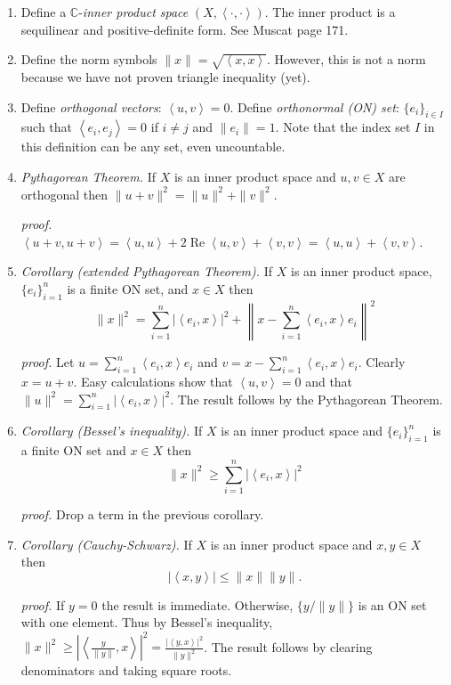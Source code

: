 \documentclass[11pt]{article}
\newcommand{\CC}{\mathbb{C}}
\renewcommand{\Re}{\operatorname{Re}}
\newcommand{\ip}[2]{\ensuremath{\left<#1,#2\right>}}
\begin{document}
\begin{enumerate}
\renewcommand{\labelenumi}{{\Large \textbf{\Alph{enumi}.}}\,}
\item Define a $\CC$-\emph{inner product space} $(X,\ip{\cdot}{\cdot})$.  The inner product is a sequilinear and positive-definite form.  See Muscat page 171.

\item Define the norm symbols $\|x\|=\sqrt{\ip{x}{x}}$.  However, this is not a norm because we have not proven triangle inequality (yet).

\item Define \emph{orthogonal vectors}: $\ip{u}{v}=0$.  Define \emph{orthonormal (ON) set}: $\{e_i\}_{i\in I}$ such that $\ip{e_i}{e_j}=0$ if $i\ne j$ and $\|e_i\|=1$.  Note that the index set $I$ in this definition can be any set, even uncountable.

\item \emph{Pythagorean Theorem.}  If $X$ is an inner product space and $u,v\in X$ are orthogonal then $\|u+v\|^2 = \|u\|^2 + \|v\|^2$.

\emph{proof.}  $\ip{u+v}{u+v} = \ip{u}{u} + 2 \Re\ip{u}{v} + \ip v v = \ip{u}{u} + \ip v v$.

\item \emph{Corollary (extended Pythagorean Theorem).}  If $X$ is an inner product space, $\{e_i\}_{i=1}^n$ is a finite ON set, and $x\in X$ then
    $$\|x\|^2 = \sum_{i=1}^n |\ip{e_i}{x}|^2 + \left\|x - \sum_{i=1}^n \ip{e_i}{x} e_i\right\|^2$$

\emph{proof.}  Let $u = \sum_{i=1}^n \ip{e_i}{x} e_i$ and $v = x - \sum_{i=1}^n \ip{e_i}{x} e_i$.  Clearly $x=u+v$.  Easy calculations show that $\ip{u}{v}=0$ and that $\|u\|^2 = \sum_{i=1}^n |\ip{e_i}{x}|^2$.  The result follows by the Pythagorean Theorem.

\item \emph{Corollary (Bessel's inequality).}  If $X$ is an inner product space and $\{e_i\}_{i=1}^n$ is a finite ON set and $x\in X$ then
    $$\|x\|^2 \ge \sum_{i=1}^n |\ip{e_i}{x}|^2$$

\emph{proof.}  Drop a term in the previous corollary.

\item \emph{Corollary (Cauchy-Schwarz).}  If $X$ is an inner product space and $x,y\in X$ then
    $$|\ip{x}{y}| \le \|x\|\|y\|.$$

\emph{proof.}  If $y=0$ the result is immediate.  Otherwise, $\{y/\|y\|\}$ is an ON set with one element.  Thus by Bessel's inequality, $\|x\|^2 \ge \left|\ip{\frac{y}{\|y\|}}{x}\right|^2 = \frac{|\ip{y}{x}|^2}{\|y\|^2}$.  The result follows by clearing denominators and taking square roots.


\end{enumerate}
\end{document}
